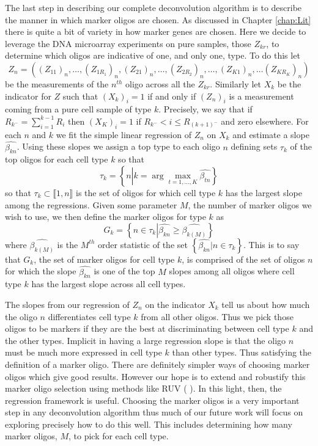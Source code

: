 \documentclass[reqno,12pt,oneside]{report}\usepackage[]{graphicx}\usepackage[]{color}
\renewcommand{\citet}[1]{(\citeauthor{#1} \citeyear{#1})}
\theoremstyle{plain}
\theoremstyle{definition}
\theoremstyle{remark}
\numberwithin{theorem}{chapter}     %
\begin{document}
The last step in describing our complete deconvolution algorithm is to describe the manner in which marker oligos are chosen. As discussed in Chapter \ref{chap:Lit} there is quite a bit of variety in how marker genes are chosen. Here we decide to leverage the DNA microarray experiments on pure samples, those $Z_{kr}$, to determine which oligos are indicative of one, and only one, type. To do this let 
$$
Z_n = ((Z_{11})_n,\ldots,(Z_{1R_1})_n,(Z_{21})_n,\ldots,(Z_{2R_2})_n,\ldots,(Z_{K1})_n,\ldots (Z_{KR_K})_n)
$$
be the measurements of the $n^{th}$ oligo across all the $Z_{kr}$. Similarly let $X_k$ be the indicator for $Z$ such that $(X_k)_i=1$ if and only if $(Z_n)_i$ is a measurement coming from a pure cell sample of type $k$. Precisely, we say that if $R_{k^-} = \sum_{i=1}^{k-1} R_i$ then $(X_K)_i = 1$ if $R_{k^-} < i \leq R_{{(k+1)}^{-}}$ and zero elsewhere. For each $n$ and $k$ we fit the simple linear regression of $Z_n$ on $X_k$ and estimate a slope $\widehat{\beta_{kn}}$. Using these slopes we assign a top type to each oligo $n$ defining sets $\tau_k$ of the top oligos for each cell type $k$ so that 
$$
\tau_k = \left\{n \left| k=\arg\max_{t=1,\ldots,K}\widehat{\beta_{tn}}\right.\right\}
$$
so that $\tau_k\subset \llbracket 1,n \rrbracket$ is the set of oligos for which cell type $k$ has the largest slope among the regressions. 
Given some parameter $M$, the number of marker oligos we wish to use, we then define the marker oligos for type $k$ as
$$
G_k = \left\{n \in \tau_k \left|\widehat{\beta_{kn}} \geq \widehat{\beta_{k(M)}}\right.\right\}
$$
where $\widehat{\beta_{k(M)}}$ is the $M^{th}$ order statistic of the set $\left\{\widehat{\beta_{kn}}\left|n\in\tau_k\right.\right\}$. This is to say that $G_k$, the set of marker oligos for cell type $k$, is comprised of the set of oligos $n$ for which the slope $\widehat{\beta_{kn}}$ is one of the top $M$ slopes among all oligos where cell type $k$ has the largest slope across all cell types. 

The slopes from our regression of $Z_n$ on the indicator $X_k$ tell us about how much the oligo $n$ differentiates cell type $k$ from all other oligos. Thus we pick those oligos to be markers if they are the best at discriminating between cell type $k$ and the other types. Implicit in having a large regression slope is that the oligo $n$ must be much more expressed in cell type $k$ than other types. Thus satisfying the definition of a marker oligo. There are definitely simpler ways of choosing marker oligos which give good results. However our hope is to extend and robustify this marker oligo selection using methods like RUV \citet{Gagnon-Bartsch2012}. In this light, then, the regression framework is useful. Choosing the marker oligos is a very important step in any deconvolution algorithm thus much of our future work will focus on exploring precisely how to do this well. This includes determining how many marker oligos, $M$, to pick for each cell type. 
\end{document}
